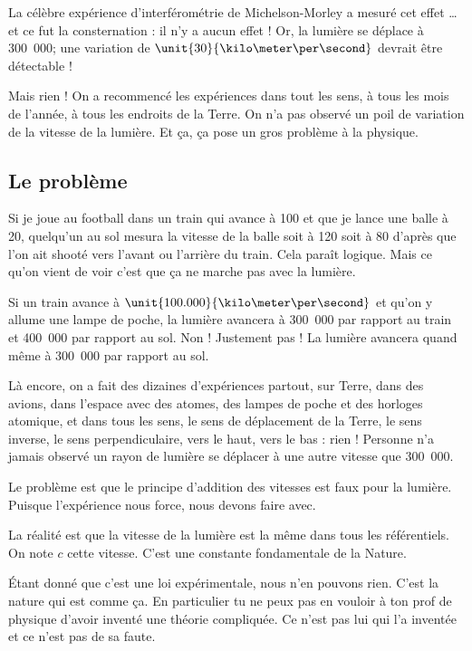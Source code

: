 La célèbre expérience d'interférométrie de Michelson-Morley\cite{BIBooJSDSooIUhMQQ} a mesuré cet effet \ldots et ce fut la consternation : il n'y a aucun effet ! Or, la lumière se déplace à \unit{300.000}{\kilo\meter\per\second}; une variation de \( \unit{30}{\kilo\meter\per\second}\) devrait être détectable !

Mais rien ! On a recommencé les expériences dans tout les sens, à tous les mois de l'année, à tous les endroits de la Terre. On n'a pas observé un poil de variation de la vitesse de la lumière. Et ça, ça pose un gros problème à la physique.


\subsection{Le problème}

Si je joue au football dans un train qui avance à \unit{100}{\kilo\meter\per\hour} et que je lance une balle à \unit{20}{\kilo\meter\per\hour}, quelqu'un au sol mesura la vitesse de la balle soit à \unit{120}{\kilo\meter\per\hour} soit à \unit{80}{\kilo\meter\per\hour} d'après que l'on ait shooté vers l'avant ou l'arrière du train. Cela paraît logique. Mais ce qu'on vient de voir c'est que ça ne marche pas avec la lumière.

Si un train avance à \( \unit{100.000}{\kilo\meter\per\second}\) et qu'on y allume une lampe de poche, la lumière avancera à \unit{300.000}{\kilo\meter\per\second} par rapport au train et \unit{400.000}{\kilo\meter\per\second} par rapport au sol. Non ! Justement pas ! La lumière avancera quand même à \unit{300.000}{\kilo\meter\per\second} par rapport au sol.

Là encore, on a fait des dizaines d'expériences partout, sur Terre, dans des avions, dans l'espace avec des atomes, des lampes de poche et des horloges atomique, et dans tous les sens, le sens de déplacement de la Terre, le sens inverse, le sens perpendiculaire, vers le haut, vers le bas : rien ! Personne n'a jamais observé un rayon de lumière se déplacer à une autre vitesse que \unit{300.000}{\kilo\meter\per\second}.

Le problème est que le principe d'addition des vitesses est faux pour la lumière. Puisque l'expérience nous force, nous devons faire avec.

\begin{loiphyz}		\label{LoiVitLum}
	La réalité est que la vitesse de la lumière est la même dans tous les référentiels. On note \( c\) cette vitesse. C'est une constante fondamentale de la Nature.
\end{loiphyz}
Étant donné que c'est une loi expérimentale, nous n'en pouvons rien. C'est la nature qui est comme ça. En particulier tu ne peux pas en vouloir à ton prof de physique d'avoir inventé une théorie compliquée. Ce n'est pas lui qui l'a inventée et ce n'est pas de sa faute.


